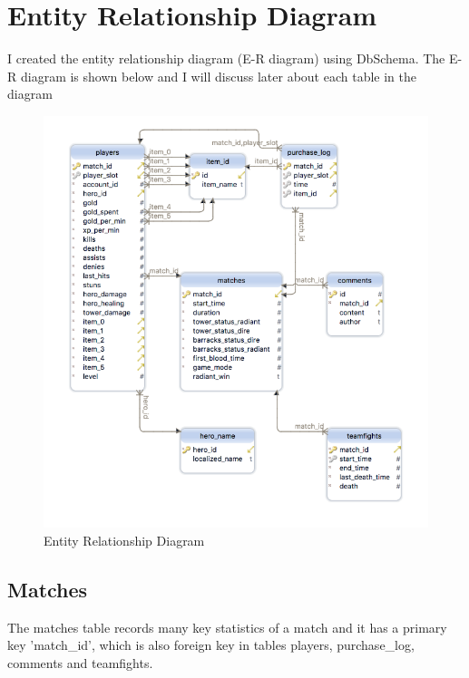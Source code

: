 \documentclass[a4paper]{article}
\begin{document}

\section{Entity Relationship Diagram}
I created the entity relationship diagram (E-R diagram) using DbSchema. The E-R diagram is shown below and I will discuss later about each table in the diagram
\begin{figure}[H]
\centering
\includegraphics[width=1.0\textwidth]{erd2.png}
\caption{Entity Relationship Diagram}
\end{figure}

\subsection{Matches}
The matches table records many key statistics of a match and it has a primary key 'match\_id', which is also foreign key in tables players, purchase\_log, comments and teamfights.
\end{document}
